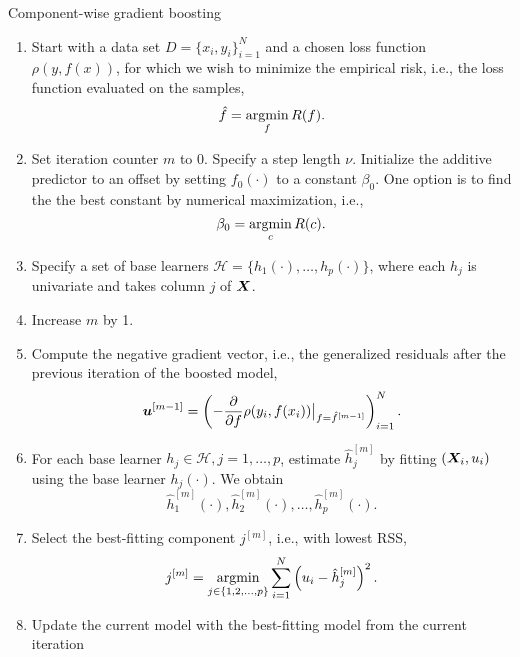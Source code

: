 \begin{algorithm}
\caption{Component-wise gradient boosting}\label{algo:component-wise}
\begin{enumerate}
    \item Start with a data set $D=\{x_i, y_i\}_{i=1}^N$ and a chosen loss function $\rho(y,f(x))$, for which we wish to
        minimize the empirical risk, i.e., the loss function evaluated on the samples,
        \begin{equation*}
            \hat{f}=\operatorname*{argmin}_{f}R(f).
        \end{equation*}
    \item Set iteration counter $m$ to 0. Specify a step length $\nu$. Initialize the additive predictor to an offset by setting $f_0(\cdot)$ to a constant $\beta_0$. One option is to find the the best constant by numerical maximization, i.e.,
        \begin{equation*}
            \beta_0=\operatorname*{argmin}_c R(c).
        \end{equation*}
    \item Specify a set of base learners $\mathcal{H}=\{h_1(\cdot),\dotsc,h_p(\cdot)\}$, where each $h_j$ is univariate and takes column $j$ of $\bm{X}$.
    \item\label{first-step} Increase $m$ by 1.
    \item Compute the negative gradient vector, i.e., the generalized residuals after the previous iteration of the boosted model,
        \begin{equation*}
            \bm{u}^{[m-1]}=\left(-\frac{\partial}{\partial f}\rho(y_i, f(x_i))\big\rvert_{f=\hat{f}^{[m-1]}}\right)_{i=1}^N.
        \end{equation*}
    \item For each base learner $h_j\in\mathcal{H},j=1,\ldots,p$, estimate $\hat{h}_{j}^{[m]}$ by fitting $(\bm{X}_i,u_i)$ using the base learner $h_j(\cdot)$. We obtain
        \begin{equation*}
            \hat{h}_1^{[m]}(\cdot),\hat{h}_2^{[m]}(\cdot),\ldots,\hat{h}_p^{[m]}(\cdot).
        \end{equation*}
    \item Select the best-fitting component $j^{[m]}$, i.e., with lowest RSS,
        \begin{equation*}
            j^{[m]}=\operatorname*{argmin}_{j\in\{1,2,\ldots,p\}}\sum_{i=1}^N \left(u_i-\hat{h}_j^{[m]}\right)^2.
        \end{equation*}
    \item\label{last-step} Update the current model with the best-fitting model from the current iteration

\end{enumerate}
\end{algorithm}
